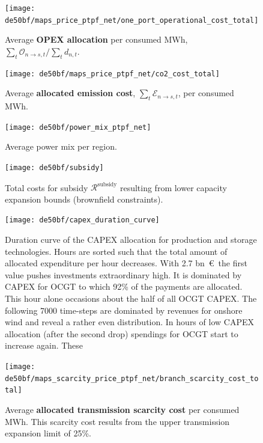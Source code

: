 \documentclass[11pt,twocolumn]{article}
\newcommand{\demand}[1][n]{d_{#1,t}}
\newcommand{\opex}{\mathcal{O}}
\newcommand{\emissioncost}{\mathcal{E}}
\newcommand{\remainingcost}{\mathcal{R}}
\newcommand{\subsidycost}{\remainingcost^\text{subsidy}}
\newcommand{\allocateopex}[1][n \rightarrow s]{\opex_{#1,t}}
\newcommand{\allocateemissioncost}[1][n \rightarrow s]{\emissioncost_{#1,t}}
\begin{document}
\begin{figure}
    \texttt{[image: de50bf/maps\_price\_ptpf\_net/one\_port\_operational\_cost\_total]}
    \caption{Average \textbf{OPEX allocation} per consumed MWh, $\sum_t \allocateopex/\sum_t \demand$.}
    \label{fig:opex_price}
\end{figure}


\begin{figure}
    \texttt{[image: de50bf/maps\_price\_ptpf\_net/co2\_cost\_total]}
    \caption{Average \textbf{allocated emission cost}, $\sum_t \allocateemissioncost$, per consumed MWh.}
    \label{fig:emission_cost}
\end{figure}


\begin{figure}
    \texttt{[image: de50bf/power\_mix\_ptpf\_net]}
    \caption{Average power mix per region.}
    \label{fig:power_mix}
\end{figure}

\begin{figure}
    \texttt{[image: de50bf/subsidy]}
    \caption{Total costs for subsidy $\subsidycost$ resulting from lower capacity expansion bounds (brownfield constraints).}
    \label{fig:subsidy}
\end{figure}


\begin{figure}
    \texttt{[image: de50bf/capex\_duration\_curve]}
    \caption{Duration curve of the CAPEX allocation for production and storage technologies. Hours are sorted such that the total amount of allocated expenditure per hour decreases. With 2.7 bn~\euro\, the first value pushes investments extraordinary high. It is dominated by CAPEX for OCGT to which 92\% of the payments are allocated. This hour alone occasions about the half of all OCGT CAPEX. The following 7000 time-steps are dominated by revenues for onshore wind and reveal a rather even distribution. In hours of low CAPEX allocation (after the second drop) spendings for OCGT start to increase again. These  }
    \label{fig:capex_duration}
\end{figure}

\begin{figure}
    \texttt{[image: de50bf/maps\_scarcity\_price\_ptpf\_net/branch\_scarcity\_cost\_total]}
    \caption{Average \textbf{allocated transmission scarcity cost} per consumed MWh. This scarcity cost results from the upper transmission expansion limit of 25\%.}
    \label{fig:branch_scarcity_price}
\end{figure}
\end{document}
